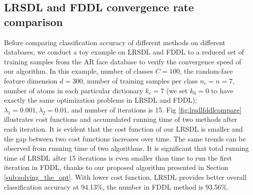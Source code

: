 \documentclass[letterpaper]{article}
\begin{document}
\subsection{LRSDL and FDDL convergence rate comparison} %
\vspace{-0.1in}
\label{sub:compare_fddl_and_lrsdl_runnng}
Before comparing classification accuracy of different methods on different databases, we conduct a toy example on LRSDL and FDDL to a reduced set of training samples from the AR face database to verify the convergence speed of our algorithm. In this example, number of classes $C = 100$, the random-face feature dimension $d = 300$, number of training samples per class $n_c = n = 7$, number of atoms in each particular dictionary $k_c = 7$ (we set $k_0 = 0$ to have exactly the same optimization problems in LRSDL and FDDL); $\lambda_1 = 0.001, \lambda_2 = 0.01$, and number of iterations is 15. Fig \ref{fig:lrsdlfddlcompare} illustrates cost functions and accumulated running time of two methods after each iteration. It is evident that the cost function of our LRSDL is smaller and the gap between two cost functions increases over time. The same trends can be observed from running time of two algorithms. It is significant that total running time of LRSDL after 15 iterations is even smaller than time to run the first iteration in FDDL, thanks to our proposed algorithm presented in Section \ref{sub:solving_the_opt}. With lower cost function, LRSDL provides better overall classification accuracy at 94.13\%, the number in FDDL method is 93.56\%.
\end{document}
